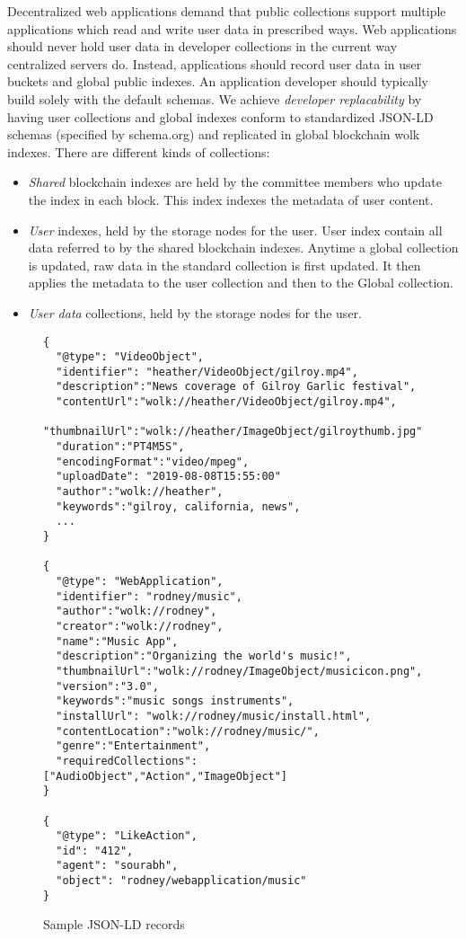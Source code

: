 \documentclass[journal]{IEEEtran}
\newcommand{\tx}[1]{\textsf{#1}}
\begin{document}
Decentralized web applications demand that public collections support multiple applications which read and write user data in prescribed ways.  Web applications should never hold user data in developer collections in the current way centralized servers do.   Instead, applications should record user data in user buckets and global public indexes.   An application developer should typically build solely with the default schemas.  We achieve {\em developer replacability} by having user collections and global indexes conform to standardized JSON-LD schemas (specified by schema.org) and replicated in global blockchain \tx{wolk} indexes.   There are different kinds of collections:
\begin{itemize}
    \item {\em Shared} blockchain indexes are held by the committee members who update the index in each block.  This index indexes the metadata of user content.
    \item {\em User} indexes, held by the storage nodes for the user.   User index contain all data referred to by the shared blockchain indexes.  Anytime a global collection is updated, raw data in the standard collection is first updated.  It then applies the metadata to the user collection and then to the Global collection.
    \item {\em User data} collections, held by the storage nodes for the user.
\end{itemize}


\begin{figure}
\begin{scriptsize}
\begin{verbatim}
{
  "@type": "VideoObject",
  "identifier": "heather/VideoObject/gilroy.mp4",
  "description":"News coverage of Gilroy Garlic festival",
  "contentUrl":"wolk://heather/VideoObject/gilroy.mp4",
  "thumbnailUrl":"wolk://heather/ImageObject/gilroythumb.jpg",
  "duration":"PT4M5S",
  "encodingFormat":"video/mpeg",
  "uploadDate": "2019-08-08T15:55:00"
  "author":"wolk://heather",
  "keywords":"gilroy, california, news",
  ...
}

{
  "@type": "WebApplication",
  "identifier": "rodney/music",
  "author":"wolk://rodney",
  "creator":"wolk://rodney",
  "name":"Music App",
  "description":"Organizing the world's music!",
  "thumbnailUrl":"wolk://rodney/ImageObject/musicicon.png",
  "version":"3.0",
  "keywords":"music songs instruments",
  "installUrl": "wolk://rodney/music/install.html",
  "contentLocation":"wolk://rodney/music/",
  "genre":"Entertainment",
  "requiredCollections":["AudioObject","Action","ImageObject"]
}

{
  "@type": "LikeAction",
  "id": "412",
  "agent": "sourabh",
  "object": "rodney/webapplication/music"
}
\end{verbatim}
\end{scriptsize}
\caption{\label{fig:jsonld} Sample JSON-LD records}
\end{figure}
\end{document}
